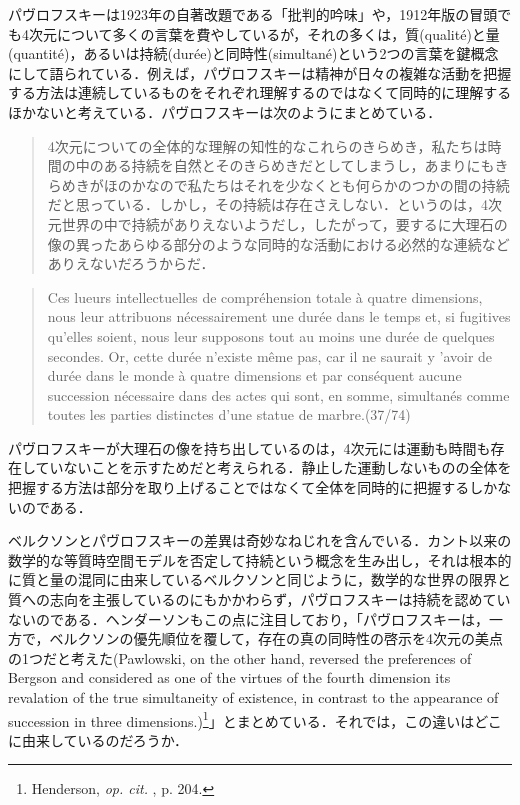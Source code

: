 パヴロフスキーは1923年の自著改題である「批判的吟味」や，1912年版の冒頭でも4次元について多くの言葉を費やしているが，それの多くは，質(qualité)と量(quantité)，あるいは持続(durée)と同時性(simultané)という2つの言葉を鍵概念にして語られている．例えば，パヴロフスキーは精神が日々の複雑な活動を把握する方法は連続しているものをそれぞれ理解するのではなくて同時的に理解するほかないと考えている．パヴロフスキーは次のようにまとめている．
\begin{quote}
4次元についての全体的な理解の知性的なこれらのきらめき，私たちは時間の中のある持続を自然とそのきらめきだとしてしまうし，あまりにもきらめきがほのかなので私たちはそれを少なくとも何らかのつかの間の持続だと思っている．しかし，その持続は存在さえしない．というのは，4次元世界の中で持続がありえないようだし，したがって，要するに大理石の像の異ったあらゆる部分のような同時的な活動における必然的な連続などありえないだろうからだ．
\end{quote}
\begin{quote}
Ces lueurs intellectuelles de compréhension totale à quatre dimensions, nous leur attribuons nécessairement une durée dans le temps et, si fugitives qu'elles soient, nous leur supposons tout au moins une durée de quelques secondes. Or, cette durée n'existe même pas, car il ne saurait y 'avoir de durée dans le monde à quatre dimensions et par conséquent aucune succession nécessaire dans des actes qui sont, en somme, simultanés comme toutes les parties distinctes d'une statue de marbre.(37/74) 
\end{quote}
パヴロフスキーが大理石の像を持ち出しているのは，4次元には運動も時間も存在していないことを示すためだと考えられる．静止した運動しないものの全体を把握する方法は部分を取り上げることではなくて全体を同時的に把握するしかないのである．

ベルクソンとパヴロフスキーの差異は奇妙なねじれを含んでいる．カント以来の数学的な等質時空間モデルを否定して持続という概念を生み出し，それは根本的に質と量の混同に由来しているベルクソンと同じように，数学的な世界の限界と質への志向を主張しているのにもかかわらず，パヴロフスキーは持続を認めていないのである．ヘンダーソンもこの点に注目しており，「パヴロフスキーは，一方で，ベルクソンの優先順位を覆して，存在の真の同時性の啓示を4次元の美点の1つだと考えた(Pawlowski, on the other hand, reversed the preferences of Bergson and considered as one of the virtues of the fourth dimension its revalation of the true simultaneity of existence, in contrast to the appearance of succession in three dimensions.)\footnote{Henderson, \emph{op. cit. }, p. 204.}」とまとめている．それでは，この違いはどこに由来しているのだろうか．

